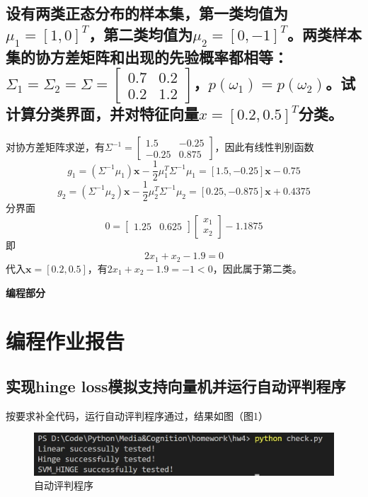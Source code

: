 \documentclass[a4paper]{article}
\begin{document}
\subsection{设有两类正态分布的样本集，第一类均值为$\mu_1=[1,0]^T$，第二类均值为$\mu_2=[0,-1]^T$。两类样本集的协方差矩阵和出现的先验概率都相等：$\Sigma_1=\Sigma_2=\Sigma=\left[ \begin{array}{cc}
    0.7 & 0.2 \\
    0.2 & 1.2
\end{array} \right]$，$p(\omega_1)=p(\omega_2)$。试计算分类界面，并对特征向量$x=[0.2,0.5]^T$分类。}
对协方差矩阵求逆，有$ \Sigma^{-1} = \left[ \begin{array}{cc}
    1.5 & -0.25 \\
    -0.25 & 0.875
\end{array} \right] $，因此有线性判别函数
$$ g_1 = \left( \Sigma^{-1} \mu_1 \right) \mathbf{x} - \frac{1}{2} \mu_1^T \Sigma^{-1} \mu_1 = [1.5, -0.25]\mathbf{x} -0.75 $$ $$ g_2 = \left( \Sigma^{-1} \mu_2 \right) \mathbf{x} - \frac{1}{2} \mu_2^T \Sigma^{-1} \mu_2 = [0.25, -0.875]\mathbf{x} + 0.4375 $$
分界面
$$ 0 = \left[ \begin{array}{cc}
    1.25 & 0.625
\end{array} \right] \left[ \begin{array}{c}
    x_1 \\
    x_2
\end{array} \right] - 1.1875 $$
即
$$ 2x_1 + x_2 - 1.9 = 0 $$
代入$ \mathbf{x} = [0.2, 0.5] $，有$ 2x_1 + x_2 - 1.9 = -1 < 0 $，因此属于第二类。

\vspace{6mm}
\centerline{\textbf{\Large{编程部分}}}
\vspace{3mm}
\section{编程作业报告}
\subsection{实现hinge loss模拟支持向量机并运行自动评判程序}
按要求补全代码，运行自动评判程序通过，结果如图（图1）
\begin{figure}
    \centering
    \includegraphics[width=12cm]{Fig_1.jpg}
    \caption{自动评判程序}
\end{figure}
\end{document}
